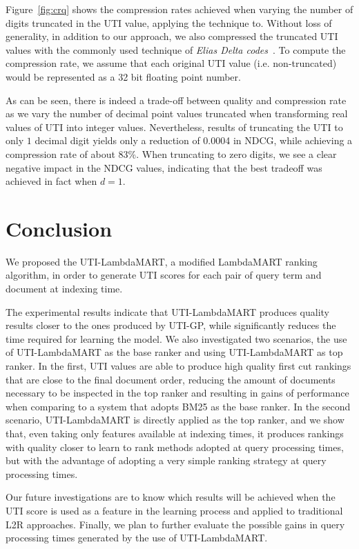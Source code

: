 \documentclass[preprint,review,10pt,3p]{elsarticle}
\begin{document}
Figure~\ref{fig:crq} shows the compression rates achieved when varying the number of digits truncated in the UTI value, applying the technique to. Without loss of generality, in addition to our approach, we also compressed the truncated UTI values with the commonly used technique of \textit{Elias Delta codes}~\cite{elias1975universal}. To compute the compression rate, we assume that each original UTI value (i.e. non-truncated) would be represented as a 32 bit floating point number. 

As can be seen, there is indeed a trade-off between quality and compression rate as we vary the number of decimal point values truncated when transforming real values of UTI into integer values.
Nevertheless, results of truncating the UTI to only $1$ decimal digit yields only a reduction of 0.0004 in NDCG, while achieving a compression rate of about 83\%.
When truncating to zero digits, we see a clear negative impact in the NDCG values, indicating that the best tradeoff was achieved in fact when $d=1$.

\section{Conclusion}

We proposed the UTI-LambdaMART, a modified LambdaMART ranking algorithm, in order to generate UTI scores for each pair of query term and document at indexing time.

The experimental results indicate that UTI-LambdaMART produces quality results closer to the ones produced by UTI-GP, while significantly reduces the time required for learning the model. 
We also investigated two scenarios, the use of UTI-LambdaMART as the base ranker and using UTI-LambdaMART as top ranker. In the first, UTI values are able to produce high quality first cut rankings that are close to the final document order, reducing the amount of documents necessary to be inspected in the top ranker and resulting
in gains of performance when comparing to a system that adopts BM25 as the base ranker. In the second scenario, UTI-LambdaMART is directly applied as the top ranker, and we show that, even taking only features available at indexing times, it produces rankings with quality closer to learn to rank methods adopted at query processing times, but with the advantage of adopting a very simple ranking
strategy at query processing times.


Our future investigations are to know which results will be achieved when the UTI score is used as a feature in the learning process and applied to traditional L2R approaches. Finally, we plan to further evaluate the possible gains in query processing times generated by the use of   UTI-LambdaMART.
\end{document}
